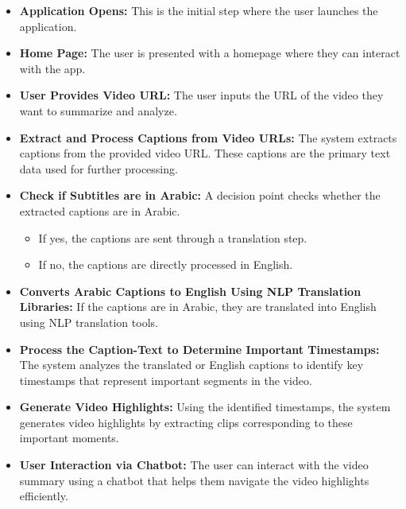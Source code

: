 \documentclass{bscs}
\begin{document}
\begin{itemize}
    \item \textbf{Application Opens:} This is the initial step where the user launches the application.
    
    \item \textbf{Home Page:} The user is presented with a homepage where they can interact with the app.
    
    \item \textbf{User Provides Video URL:} The user inputs the URL of the video they want to summarize and analyze.
    
    \item \textbf{Extract and Process Captions from Video URLs:} The system extracts captions from the provided video URL. These captions are the primary text data used for further processing.
    
    \item \textbf{Check if Subtitles are in Arabic:} A decision point checks whether the extracted captions are in Arabic.
    
    \begin{itemize}
        \item If yes, the captions are sent through a translation step.
        \item If no, the captions are directly processed in English.
    \end{itemize}
    
    \item \textbf{Converts Arabic Captions to English Using NLP Translation Libraries:} If the captions are in Arabic, they are translated into English using NLP translation tools.
    
    \item \textbf{Process the Caption-Text to Determine Important Timestamps:} The system analyzes the translated or English captions to identify key timestamps that represent important segments in the video.
    
    \item \textbf{Generate Video Highlights:} Using the identified timestamps, the system generates video highlights by extracting clips corresponding to these important moments.
    
    \item \textbf{User Interaction via Chatbot:} The user can interact with the video summary using a chatbot that helps them navigate the video highlights efficiently.
\end{itemize}
\end{document}

